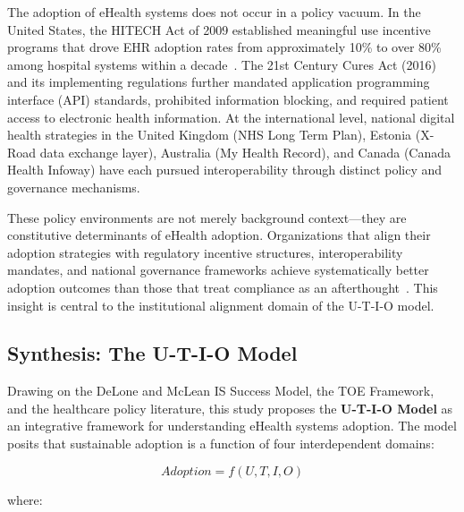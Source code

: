 The adoption of eHealth systems does not occur in a policy vacuum. In the United States, the HITECH Act of 2009 established meaningful use incentive programs that drove EHR adoption rates from approximately 10\% to over 80\% among hospital systems within a decade~\cite{adlermilstein2017hitech,onc2025reports}. The 21st Century Cures Act (2016) and its implementing regulations further mandated application programming interface (API) standards, prohibited information blocking, and required patient access to electronic health information. At the international level, national digital health strategies in the United Kingdom (NHS Long Term Plan), Estonia (X-Road data exchange layer), Australia (My Health Record), and Canada (Canada Health Infoway) have each pursued interoperability through distinct policy and governance mechanisms.

These policy environments are not merely background context—they are constitutive determinants of eHealth adoption. Organizations that align their adoption strategies with regulatory incentive structures, interoperability mandates, and national governance frameworks achieve systematically better adoption outcomes than those that treat compliance as an afterthought~\cite{holmgren2023policyhie}. This insight is central to the institutional alignment domain of the U-T-I-O model.

\subsection{Synthesis: The U-T-I-O Model}

Drawing on the DeLone and McLean IS Success Model, the TOE Framework, and the healthcare policy literature, this study proposes the \textbf{U-T-I-O Model} as an integrative framework for understanding eHealth systems adoption. The model posits that sustainable adoption is a function of four interdependent domains:

\begin{equation}
Adoption = f(U, T, I, O)
\end{equation}

\noindent where:

